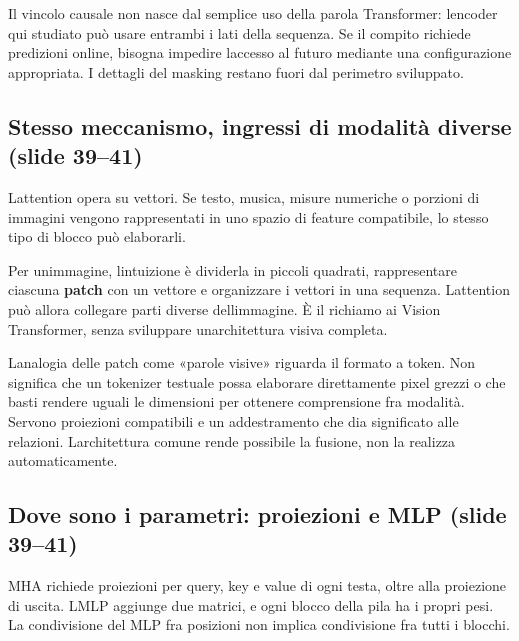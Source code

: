 \documentclass[11pt,a4paper,oneside,openany]{book}
\begin{document}
Il vincolo causale non nasce dal semplice uso della parola Transformer: l\textquotesingle encoder qui studiato può usare entrambi i lati della sequenza. Se il compito richiede predizioni online, bisogna impedire l\textquotesingle accesso al futuro mediante una configurazione appropriata. I dettagli del masking restano fuori dal perimetro sviluppato.

\subsection{Stesso meccanismo, ingressi di modalità diverse (slide 39--41)}\label{f04-r838}

L\textquotesingle attention opera su vettori. Se testo, musica, misure numeriche o porzioni di immagini vengono rappresentati in uno spazio di feature compatibile, lo stesso tipo di blocco può elaborarli.

Per un\textquotesingle immagine, l\textquotesingle intuizione è dividerla in piccoli quadrati, rappresentare ciascuna \textbf{patch} con un vettore e organizzare i vettori in una sequenza. L\textquotesingle attention può allora collegare parti diverse dell\textquotesingle immagine. È il richiamo ai Vision Transformer, senza sviluppare un\textquotesingle architettura visiva completa.

L\textquotesingle analogia delle patch come «parole visive» riguarda il formato a token. Non significa che un tokenizer testuale possa elaborare direttamente pixel grezzi o che basti rendere uguali le dimensioni per ottenere comprensione fra modalità. Servono proiezioni compatibili e un addestramento che dia significato alle relazioni. L\textquotesingle architettura comune rende possibile la fusione, non la realizza automaticamente.

\subsection{Dove sono i parametri: proiezioni e MLP (slide 39--41)}\label{f04-r846}

MHA richiede proiezioni per query, key e value di ogni testa, oltre alla proiezione di uscita. L\textquotesingle MLP aggiunge due matrici, e ogni blocco della pila ha i propri pesi. La condivisione del MLP fra posizioni non implica condivisione fra tutti i blocchi.
\end{document}
